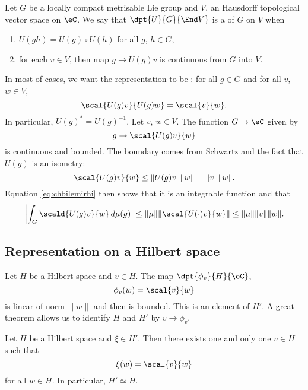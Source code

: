 Let $G$ be a locally compact metrisable Lie group and $V$, an Hausdorff topological vector space on $\eC$. We say that $\dpt{U}{G}{\End V}$ is a  of $G$ on $V$ when
\begin{enumerate}
\item $U(gh)=U(g)\circ U(h)$ for all $g$, $h\in G$,
\item for each $v\in V$, then map $g\to U(g)v$ is continuous from $G$ into $V$.
\end{enumerate}
In most of cases, we want the representation to be : for all $g\in G$ and for all $v$, $w\in V$,
\begin{equation}
  \scal{U(g)v}{U(g)w}=\scal{v}{w}.
\end{equation}
In particular, $U(g)^*=U(g)^{-1}$. Let $v$, $w\in V$. The function $G\to\eC$ given by
\[
  g\to \scal{U(g)v}{w}
\]
is continuous and bounded. The boundary comes from Schwartz and the fact that $U(g)$ is an isometry:
\begin{equation}
  \scal{U(g)v}{w}\leq \| U(g)v \|\| w \|
		=\| v \|\| w \|.
\end{equation}
Equation \eqref{eq:chbilemirhi} then shows that it is an integrable function and that
\begin{equation} \label{eq:Tmuvborn}
\left|    \int_G\scald{U(g)v}{w}\,d\mu(g)   \right|\leq\| \mu \|\| \scal{U(\cdot)v}{w} \|
						\leq \| \mu \|\| v \|\| w \|.
\end{equation}

\subsection{Representation on a Hilbert space}

Let $H$ be a Hilbert space and $v\in H$. The map $\dpt{\phi_v}{H}{\eC}$,
\[
  \phi_v(w)=\scal{v}{w}
\]
is linear of norm $\| w \|$ and then is bounded. This is an element of $H'$. A great theorem allows us to identify $H$ and $H'$ by $v\to\phi_v$.

\begin{theorem}
   Let $H$ be a Hilbert space and $\xi\in H'$. Then there exists one and only one $v\in H$ such that
\[
  \xi(w)=\scal{v}{w}
\]
for all $w\in H$. In particular, $H'\simeq H$.
\end{theorem}

